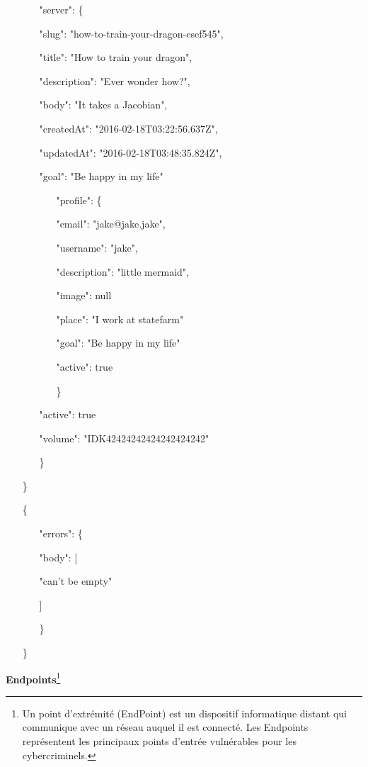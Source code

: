\documentclass{article}
\begin{document}
\begin{itemize}
\begin{itemize}
		\item["server": \{]
			\item[]"slug": "how-to-train-your-dragon-esef545",
			\item[]"title": "How to train your dragon",
			\item[]"description": "Ever wonder how?",
			\item[]"body": "It takes a Jacobian",
			\item[]"createdAt": "2016-02-18T03:22:56.637Z",
			\item[]"updatedAt": "2016-02-18T03:48:35.824Z",
			\item[]"goal": "Be happy in my life"
			\item[]
			\begin{itemize}
				\item["profile": \{]
					\item[]"email": "jake@jake.jake",
					\item[]"username": "jake",
					\item[]"description": "little mermaid",
					\item[]"image": null
					\item[]"place": "I work at statefarm"
					\item[]"goal": "Be happy in my life"
					\item[]"active": true
				\item[\}]
			\end{itemize}
			\item[]"active": true
			\item[]"volume": "IDK42424242424242424242"
		\item[\}]
	\end{itemize}
	\item[\}]
	\item[]
	\item[]
	\item[\{]
	\item[]
	\begin{itemize}
		\item["errors": \{]
			\item["body":][
			\item[]"can't be empty"
			\item[]]
		\item[\}]
	\end{itemize}
	\item[\}]
\end{itemize}
\newpage
\textbf{Endpoints}\footnote{\label{EndPoints}Un point d'extrémité (EndPoint) est un dispositif informatique distant qui communique avec un réseau auquel il est connecté. Les Endpoints représentent les principaux points d'entrée vulnérables pour les cybercriminels.}
\end{document}
